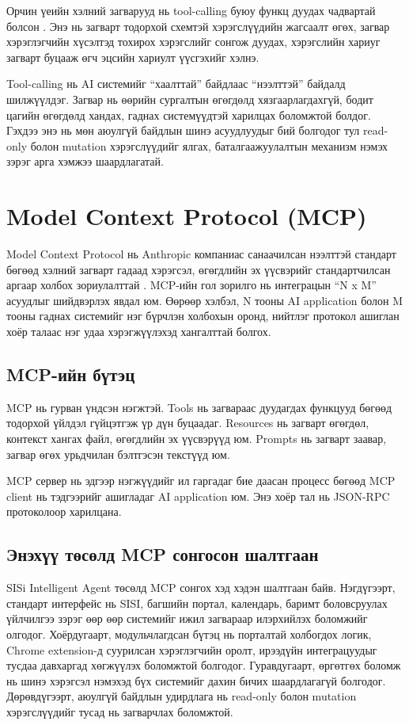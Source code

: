 Орчин үеийн хэлний загварууд нь tool-calling буюу функц дуудах чадвартай болсон \citep{openai-functions}. Энэ нь загварт тодорхой схемтэй хэрэгслүүдийн жагсаалт өгөх, загвар хэрэглэгчийн хүсэлтэд тохирох хэрэгслийг сонгож дуудах, хэрэгслийн хариуг загварт буцааж өгч эцсийн хариулт үүсгэхийг хэлнэ.

Tool-calling нь AI системийг ``хаалттай'' байдлаас ``нээлттэй'' байдалд шилжүүлдэг. Загвар нь өөрийн сургалтын өгөгдөлд хязгаарлагдахгүй, бодит цагийн өгөгдөлд хандах, гаднах системүүдтэй харилцах боломжтой болдог. Гэхдээ энэ нь мөн аюулгүй байдлын шинэ асуудлуудыг бий болгодог тул read-only болон mutation хэрэгслүүдийг ялгах, баталгаажуулалтын механизм нэмэх зэрэг арга хэмжээ шаардлагатай.

\section{Model Context Protocol (MCP)}

Model Context Protocol нь Anthropic компаниас санаачилсан нээлттэй стандарт бөгөөд хэлний загварт гадаад хэрэгсэл, өгөгдлийн эх үүсвэрийг стандартчилсан аргаар холбох зориулалттай \citep{mcp-intro}. MCP-ийн гол зорилго нь интеграцын ``N x M'' асуудлыг шийдвэрлэх явдал юм. Өөрөөр хэлбэл, N тооны AI application болон M тооны гаднах системийг нэг бүрчлэн холбохын оронд, нийтлэг протокол ашиглан хоёр талаас нэг удаа хэрэгжүүлэхэд хангалттай болгох.

\subsection{MCP-ийн бүтэц}

MCP нь гурван үндсэн нэгжтэй. Tools нь загвараас дуудагдах функцууд бөгөөд тодорхой үйлдэл гүйцэтгэж үр дүн буцаадаг. Resources нь загварт өгөгдөл, контекст хангах файл, өгөгдлийн эх үүсвэрүүд юм. Prompts нь загварт заавар, загвар өгөх урьдчилан бэлтгэсэн текстүүд юм.

MCP сервер нь эдгээр нэгжүүдийг ил гаргадаг бие даасан процесс бөгөөд MCP client нь тэдгээрийг ашигладаг AI application юм. Энэ хоёр тал нь JSON-RPC протоколоор харилцана.

\subsection{Энэхүү төсөлд MCP сонгосон шалтгаан}

SISi Intelligent Agent төсөлд MCP сонгох хэд хэдэн шалтгаан байв. Нэгдүгээрт, стандарт интерфейс нь SISI, багшийн портал, календарь, баримт боловсруулах үйлчилгээ зэрэг өөр өөр системийг ижил загвараар илэрхийлэх боломжийг олгодог. Хоёрдугаарт, модульчлагдсан бүтэц нь порталтай холбогдох логик, Chrome extension-д суурилсан хэрэглэгчийн оролт, ирээдүйн интеграцуудыг тусдаа давхаргад хөгжүүлэх боломжтой болгодог. Гуравдугаарт, өргөтгөх боломж нь шинэ хэрэгсэл нэмэхэд бүх системийг дахин бичих шаардлагагүй болгодог. Дөрөвдүгээрт, аюулгүй байдлын удирдлага нь read-only болон mutation хэрэгслүүдийг тусад нь загварчлах боломжтой.

